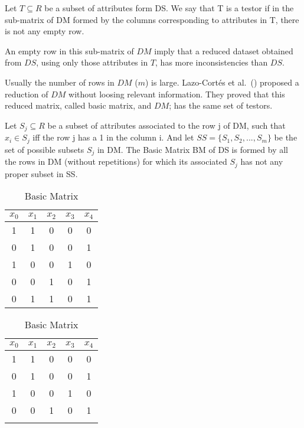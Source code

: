 \documentclass[citeauthoryear]{llncs}
\begin{document}
	\begin{definition}\label{def:testor}
		Let $T \subseteq R$ be a subset of attributes form DS. We say that T is a testor if in the sub-matrix
		of DM formed by the columns corresponding to attributes in T, there is not any empty row.
	\end{definition}
	
	An empty row in this sub-matrix of $DM$ imply that a reduced dataset obtained from $DS$, using only those 
	attributes in $T$, has more inconsistencies than $DS$. 	
	
	Usually the number of rows in $DM$ ($m$) is large. Lazo-Cort\'es et al.~(\cite{Lazo2001}) proposed a reduction
	of $DM$ without loosing relevant information. They proved that this reduced matrix, called basic matrix, and
	$DM$; has the same set of testors. 
	
	\begin{definition} \label{def:BM}
		Let $S_{j} \subseteq R$ be a subset of attributes associated to the row j of DM, such that $x_i \in S_{j}$
		iff the row j has a 1 in the column i. And let $SS=\lbrace S_1, S_2,...,S_m  \rbrace$ be the set of
		possible subsets $S_{j}$ in DM. The Basic Matrix BM of DS is formed by all the rows in DM (without
		repetitions) for which its associated $S_{j}$ has not any proper subset in SS.
	\end{definition}
	
	\begin{table}[!htb]
    \begin{minipage}{.5\linewidth}
      \caption{Discernibility Matrix}
      \centering
        \begin{tabular}{ccccc}\label{tab:DM}
            $x_0$ & $x_1$ & $x_2$ & $x_3$ & $x_4$\\
        		\hline
        		1&1&0&0&0\\
        		0&1&0&0&1\\
        		1&0&0&1&0\\
        		0&0&1&0&1\\
        		0&1&1&0&1\\
        \end{tabular}
    \end{minipage}%
    \begin{minipage}{.5\linewidth}
      \centering
        \caption{Basic Matrix}
        \begin{tabular}{ccccc}\label{tab:BM}
            $x_0$ & $x_1$ & $x_2$ & $x_3$ & $x_4$\\
        		\hline
        		1&1&0&0&0\\
        		0&1&0&0&1\\
        		1&0&0&1&0\\
        		0&0&1&0&1\\
        		\\
        \end{tabular}
    	\end{minipage} 
	\end{table}
	
\end{document}
